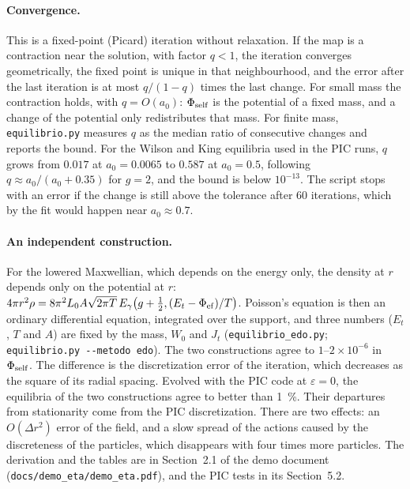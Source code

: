 \documentclass[11pt,a4paper]{article}
\begin{document}
\paragraph{Convergence.} This is a fixed-point (Picard) iteration without relaxation. If
the map is a contraction near the solution, with factor $q<1$, the iteration converges
geometrically, the fixed point is unique in that neighbourhood, and the error after the
last iteration is at most $q/(1-q)$ times the last change. For small mass the contraction
holds, with $q=O(a_0)$: $\Phi_{\rm self}$ is the potential of a fixed mass, and a change of the
potential only redistributes that mass. For finite mass, \texttt{equilibrio.py} measures $q$
as the median ratio of consecutive changes and reports the bound. For the Wilson and King
equilibria used in the PIC runs, $q$ grows from $0.017$ at $a_0=0.0065$ to $0.587$ at $a_0=0.5$,
following $q\approx a_0/(a_0+0.35)$ for $g=2$, and the bound is below $10^{-13}$. The script stops
with an error if the change is still above the tolerance after 60 iterations, which by the
fit would happen near $a_0\approx0.7$.

\paragraph{An independent construction.} For the lowered Maxwellian, which depends on the
energy only, the density at $r$ depends only on the potential at $r$:
$4\pi r^2\rho=8\pi^2L_0A\sqrt{2\pi T}\,E_\gamma\big(g+\tfrac12,(E_t-\Phi_{\rm ef})/T\big)$. Poisson's equation is then
an ordinary differential equation, integrated over the support, and three numbers
($E_t$, $T$ and $A$) are fixed by the mass, $W_0$ and $J_t$ (\texttt{equilibrio\_\allowbreak edo.py};
\texttt{equilibrio.py -{}-metodo edo}). The two constructions agree to $1$--$2\times10^{-6}$ in
$\Phi_{\rm self}$. The difference is the discretization error of the iteration, which
decreases as the square of its radial spacing. Evolved with the PIC code at $\varepsilon=0$, the
equilibria of the two constructions agree to better than \SI{1}{\%}. Their departures from
stationarity come from the PIC discretization. There are two effects: an $O(\Delta r^2)$ error
of the field, and a slow spread of the actions caused by the discreteness of the particles,
which disappears with four times more particles. The derivation and the tables are in Section~2.1 of the demo
document (\texttt{docs/\allowbreak demo\_\allowbreak eta/\allowbreak demo\_\allowbreak eta.pdf}), and
the PIC tests in its Section~5.2.
\end{document}
